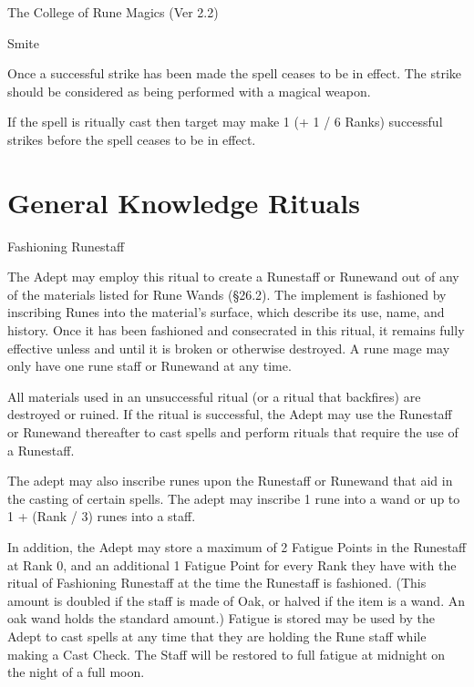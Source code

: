 \begin{Chapter}{The College of Rune Magics (Ver 2.2)}
\begin{spell}[G-7]{Smite}
\begin{effects}
Once a successful strike has been made the spell ceases to be in
effect. The strike should be considered as being performed with a
magical weapon.

If the spell is ritually cast then target may make 1 (+ 1 / 6 Ranks)
successful strikes before the spell ceases to be in effect.
\end{effects}
\end{spell}

\section{General Knowledge Rituals}

\begin{ritual}[Q-1]{Fashioning Runestaff}

\begin{effects}
The Adept may employ this ritual to create a Runestaff or Runewand out
of any of the materials listed for Rune Wands (§26.2). The implement
is fashioned by inscribing Runes into the material’s surface, which
describe its use, name, and history.  Once it has been fashioned and
consecrated in this ritual, it remains fully effective unless and
until it is broken or otherwise destroyed.  A rune mage may only have
one rune staff or Runewand at any time.

All materials used in an unsuccessful ritual (or a ritual that
backfires) are destroyed or ruined. If the ritual is successful, the
Adept may use the Runestaff or Runewand thereafter to cast spells and
perform rituals that require the use of a Runestaff.

The adept may also inscribe runes upon the Runestaff or Runewand that
aid in the casting of certain spells. The adept may inscribe 1 rune
into a wand or up to 1 + (Rank / 3) runes into a staff.

In addition, the Adept may store a maximum of 2 Fatigue Points in the
Runestaff at Rank 0, and an additional 1 Fatigue Point for every Rank
they have with the ritual of Fashioning Runestaff at the time the
Runestaff is fashioned.  (This amount is doubled if the staff is made
of Oak, or halved if the item is a wand.  An oak wand holds the
standard amount.)  Fatigue is stored may be used by the Adept to cast
spells at any time that they are holding the Rune staff while making a
Cast Check. The Staff will be restored to full fatigue at midnight on
the night of a full moon.
\end{effects}
\end{ritual}


\end{Chapter}
